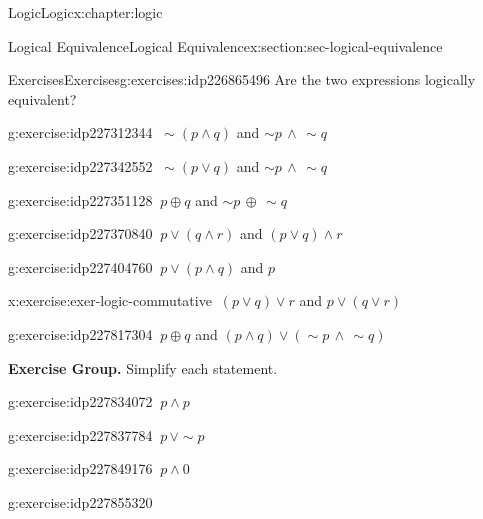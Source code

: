 \documentclass[twoside,10pt,]{book}
\numberwithin{equation}{section}
\begin{document}
\begin{chapterptx}{Logic}{}{Logic}{}{}{x:chapter:logic}
\begin{sectionptx}{Logical Equivalence}{}{Logical Equivalence}{}{}{x:section:sec-logical-equivalence}
\begin{exercises-subsection}{Exercises}{}{Exercises}{}{}{g:exercises:idp226865496}
Are the two expressions logically equivalent?\begin{exercisegroup}
\begin{divisionexerciseeg}{11}{}{}{g:exercise:idp227312344}%
\(\ \sim\!(p{\wedge} q)\) and \(\sim\!{p}\,{\wedge}\,\sim\!{q}\)\end{divisionexerciseeg}%
\begin{divisionexerciseeg}{12}{}{}{g:exercise:idp227342552}%
\(\ \sim\!(p{\vee} q)\) and \(\sim\!{p}\,{\wedge}\,\sim\!{q}\)\end{divisionexerciseeg}%
\begin{divisionexerciseeg}{13}{}{}{g:exercise:idp227351128}%
\(\ p{\oplus} q\) and \(\sim\!{p}\,{\oplus}\,\sim\!{q}\)\end{divisionexerciseeg}%
\begin{divisionexerciseeg}{14}{}{}{g:exercise:idp227370840}%
\(\ p{\vee}(q{\wedge} r)\) and \((p{\vee} q){\wedge} r\)\end{divisionexerciseeg}%
\begin{divisionexerciseeg}{15}{}{}{g:exercise:idp227404760}%
\(\ p{\vee}(p{\wedge} q)\) and \(p\)\end{divisionexerciseeg}%
\begin{divisionexerciseeg}{16}{}{}{x:exercise:exer-logic-commutative}%
\(\ (p{\vee} q){\vee} r\) and \(p{\vee} (q{\vee} r)\)\end{divisionexerciseeg}%
\begin{divisionexerciseeg}{17}{}{}{g:exercise:idp227817304}%
\(\ p{\oplus} q\) and \((p{\wedge} q){\vee} (\sim\!{p}\,{\wedge}\,\sim\!{q})\)\end{divisionexerciseeg}%
\end{exercisegroup}
\par\medskip\noindent
\par\medskip\noindent%
\textbf{Exercise Group.}\space\space%
Simplify each statement.\begin{exercisegroup}
\begin{divisionexerciseeg}{18}{}{}{g:exercise:idp227834072}%
\(\ p{\wedge} p\)\end{divisionexerciseeg}%
\begin{divisionexerciseeg}{19}{}{}{g:exercise:idp227837784}%
\(\ p\,{\vee}\sim\!{p}\)\end{divisionexerciseeg}%
\begin{divisionexerciseeg}{20}{}{}{g:exercise:idp227849176}%
\(\ p{\wedge} 0\)\end{divisionexerciseeg}%
\begin{divisionexerciseeg}{21}{}{}{g:exercise:idp227855320}%

\end{divisionexerciseeg}
\end{exercisegroup}
\end{exercises-subsection}
\end{sectionptx}
\end{chapterptx}
\end{document}
